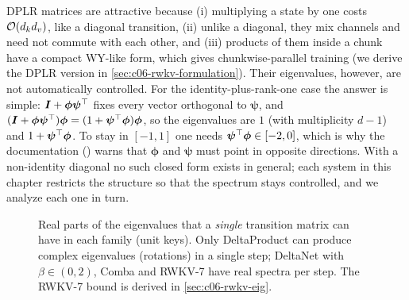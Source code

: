 DPLR matrices are attractive because (i) multiplying a state by one costs $\mathcal{O}(d_kd_v)$,
like a diagonal transition, (ii) unlike a diagonal, they mix channels and need not commute
with each other, and (iii) products of them inside a chunk have a compact
WY-like form, which gives chunkwise-parallel training (we derive the DPLR version in
\cref{sec:c06-rwkv-formulation}). Their eigenvalues, however, are not automatically
controlled. For the identity-plus-rank-one case the answer is simple: $\bm{I}+\bm\phi\bm\psi^{\top}$
fixes every vector orthogonal to $\bm\psi$, and $(\bm{I}+\bm\phi\bm\psi^{\top})\bm\phi=
(1+\bm\psi^{\top}\bm\phi)\bm\phi$, so the eigenvalues are $1$ (with multiplicity $d-1$) and
$1+\bm\psi^{\top}\bm\phi$. To stay in $[-1,1]$ one needs $\bm\psi^{\top}\bm\phi\in[-2,0]$, which is why
the \fla{} documentation ()
warns that $\bm\phi$ and $\bm\psi$ must point in opposite directions. With a non-identity
diagonal no such closed form exists in general; each system in this chapter restricts the
structure so that the spectrum stays controlled, and we analyze each one in turn.

\begin{figure}[t]
\centering
{}
\caption{Real parts of the eigenvalues that a \emph{single} transition matrix can have in
each family (unit keys). Only DeltaProduct can produce complex eigenvalues (rotations) in a
single step; DeltaNet with $\beta\in(0,2)$, Comba and RWKV-7 have real spectra per step.
The RWKV-7 bound is derived in \cref{sec:c06-rwkv-eig}.}
\label{fig:c06-eig}
\end{figure}

